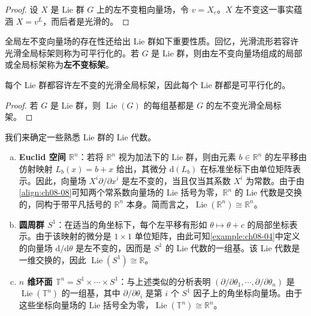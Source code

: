 \documentclass[../../main.tex]{subfiles}
\begin{document}
\begin{proof}
设 $X$ 是 Lie 群 $G$ 上的左不变粗向量场，令 $v=X_e$。$X$ 左不变这一事实蕴涵 $X=v^L$，而后者是光滑的。
\end{proof}

全局左不变向量场的存在性还给出 Lie 群如下重要性质。回忆，光滑流形若容许光滑全局标架则称为可平行化的。若 $G$ 是 Lie 群，则由左不变向量场组成的局部或全局标架称为\textbf{左不变标架}。

\begin{corollary}\label{corollary:ch08-39}
每个 Lie 群都容许左不变的光滑全局标架，因此每个 Lie 群都是可平行化的。
\end{corollary}

\begin{proof}
若 $G$ 是 Lie 群，则 $\operatorname{Lie}(G)$ 的每组基都是 $G$ 的左不变光滑全局标架。
\end{proof}

\begin{example}\label{example:ch08-40}
我们来确定一些熟悉 Lie 群的 Lie 代数。
\begin{enumerate}[(a)]
\item \textbf{Euclid 空间 $\mathbb{R}^n$}：若将 $\mathbb{R}^n$ 视为加法下的 Lie 群，则由元素 $b\in\mathbb{R}^n$ 的左平移由仿射映射 $L_b(x)=b+x$ 给出，其微分 $\mathrm{d}(L_b)$ 在标准坐标下由单位矩阵表示。因此，向量场 $X^i\partial/\partial x^i$ 是左不变的，当且仅当其系数 $X^i$ 为常数。由于由\eqref{align:ch08-08}可知两个常系数向量场的 Lie 括号为零，$\mathbb{R}^n$ 的 Lie 代数是交换的，同构于带平凡括号的 $\mathbb{R}^n$ 本身。简而言之，$\operatorname{Lie}(\mathbb{R}^n)\cong\mathbb{R}^n$。

\item \textbf{圆周群 $S^1$}：在适当的角坐标下，每个左平移有形如 $\theta\mapsto\theta+c$ 的局部坐标表示。由于该映射的微分是 $1\times1$ 单位矩阵，由此可知\cref{example:ch08-04}中定义的向量场 $\mathrm{d}/\mathrm{d}\theta$ 是左不变的，因而是 $S^1$ 的 Lie 代数的一组基。该 Lie 代数是一维交换的，因此 $\operatorname{Lie}(S^1)\cong\mathbb{R}$。

\item \textbf{$n$ 维环面 $\mathbb{T}^n=S^1\times\cdots\times S^1$}：与上述类似的分析表明 $(\partial/\partial\theta_1,\cdots ,\partial/\partial\theta_n)$ 是 $\operatorname{Lie}(\mathbb{T}^n)$ 的一组基，其中 $\partial/\partial\theta_i$ 是第 $i$ 个 $S^1$ 因子上的角坐标向量场。由于这些坐标向量场的 Lie 括号全为零，$\operatorname{Lie}(\mathbb{T}^n)\cong\mathbb{R}^n$。
\end{enumerate}
\end{example}
\end{document}
